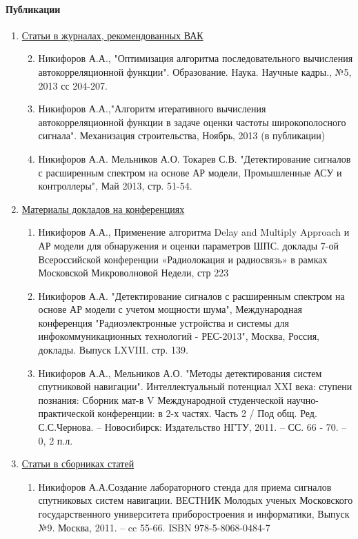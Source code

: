\paragraph{Публикации}
\begin{enumerate}
	\item {\underline{Статьи в журналах, рекомендованных ВАК}}
	\begin{enumerate}
		\setcounter{enumi}{1}
		\item Никифоров А.А., "Оптимизация алгоритма последовательного вычисления автокорреляционной функции".
			Образование. Наука. Научные кадры., №5, 2013 сс 204-207.
		\item Никифоров А.А.,"Алгоритм итеративного вычисления автокорреляционной функции в задаче оценки частоты широкополосного сигнала".
			Механизация строительства, Ноябрь, 2013 (в публикации)
		\item Никифоров А.А. Мельников А.О. Токарев С.В. "Детектирование сигналов с расширенным спектром на основе АР модели,
			Промышленные АСУ и контроллеры", Май 2013, стр. 51-54.
	\end{enumerate}

	\item {\underline{Материалы докладов на конференциях}}
	\begin{enumerate}
		\item Никифоров А.А., Применение алгоритма Delay and Multiply Approach и АР модели для обнаружения и оценки параметров ШПС. 
			доклады 7-ой Всероссийской конференции «Радиолокация и радиосвязь» в рамках Московской Микроволновой Недели, стр 223 
		\item Никифоров А.А. "Детектирование сигналов с расширенным спектром на основе АР модели с учетом мощности шума", Международная конференция
			"Радиоэлектронные устройства и системы для инфокоммуникационных технологий - РЕС-2013", Москва, Россия, доклады. Выпуск LXVIII. стр. 139.
		\item Никифоров А.А., Мельников А.О. "Методы детектирования систем спутниковой навигации". Интеллектуальный потенциал XXI века:
			ступени познания: Сборник мат-в V Международной студенческой научно-практической конференции: в 2-х частях. Часть 2 / Под общ. Ред.
			С.С.Чернова. – Новосибирск: Издательство НГТУ, 2011. – СС. 66 - 70. – 0, 2 п.л.
	\end{enumerate}

	\item {\underline{Статьи в сборниках статей}}
	\begin{enumerate}
		\item Никифоров А.А.Создание лабораторного стенда для приема сигналов спутниковых систем навигации. ВЕСТНИК Молодых ученых Московского
			государственного университета приборостроения и информатики, Выпуск №9. Москва, 2011. – cc 55-66. ISBN 978-5-8068-0484-7
	\end{enumerate}
\end{enumerate}
